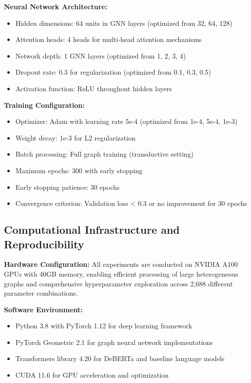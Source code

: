 \textbf{Neural Network Architecture:}
\begin{itemize}
\item Hidden dimensions: 64 units in GNN layers (optimized from {32, 64, 128})
\item Attention heads: 4 heads for multi-head attention mechanisms
\item Network depth: 1 GNN layers (optimized from {1, 2, 3, 4})
\item Dropout rate: 0.3 for regularization (optimized from {0.1, 0.3, 0.5})
\item Activation function: ReLU throughout hidden layers
\end{itemize}

\textbf{Training Configuration:}
\begin{itemize}
\item Optimizer: Adam with learning rate 5e-4 (optimized from {1e-4, 5e-4, 1e-3})
\item Weight decay: 1e-3 for L2 regularization
\item Batch processing: Full graph training (transductive setting)
\item Maximum epochs: 300 with early stopping
\item Early stopping patience: 30 epochs
\item Convergence criterion: Validation loss < 0.3 or no improvement for 30 epochs
\end{itemize}

\subsection{Computational Infrastructure and Reproducibility}

\textbf{Hardware Configuration:} All experiments are conducted on NVIDIA A100 GPUs with 40GB memory, enabling efficient processing of large heterogeneous graphs and comprehensive hyperparameter exploration across 2,688 different parameter combinations.

\textbf{Software Environment:}
\begin{itemize}
\item Python 3.8 with PyTorch 1.12 for deep learning framework
\item PyTorch Geometric 2.1 for graph neural network implementations
\item Transformers library 4.20 for DeBERTa and baseline language models
\item CUDA 11.6 for GPU acceleration and optimization
\end{itemize}

